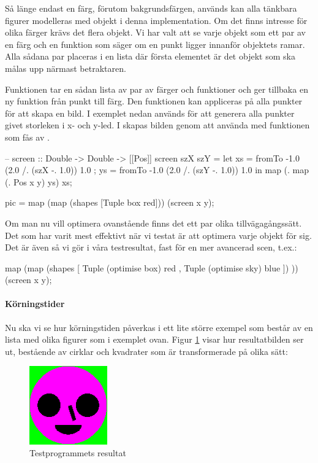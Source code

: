 \documentclass[Rapport]{subfiles}
\begin{document}
Så länge endast en färg, förutom bakgrundsfärgen, används kan alla tänkbara figurer modelleras
med objekt i denna implementation. Om det finns intresse för olika färger krävs det
flera objekt. Vi har valt att se varje objekt som ett par
av en färg och en funktion som säger om en punkt ligger innanför objektets ramar. 
Alla sådana par placeras i en lista där första elementet är det
objekt som ska målas upp närmast betraktaren. 

Funktionen  tar en sådan lista av par av färger och funktioner och 
ger tillbaka en ny funktion från punkt till färg. Den funktionen kan
appliceras på alla punkter för att skapa en bild. I exemplet nedan används 
för att generera alla punkter givet storleken i x- och y-led. I  skapas 
bilden genom att använda  med funktionen som fås av .

\begin{codeEx}

-- screen :: Double -> Double -> [[Pos]]
screen szX szY = let { xs = fromTo -1.0 (2.0 /. (szX -. 1.0)) 1.0
                     ; ys = fromTo -1.0 (2.0 /. (szY -. 1.0)) 1.0
                     }
                 in map (\x . map (\y . Pos x y) ys) xs;

pic = map (map (shapes [Tuple box red])) (screen x y);

\end{codeEx}

Om man nu vill optimera ovanstående finns det ett par olika tillvägagångssätt. 
Det som har varit mest effektivt när vi testat är att optimera varje objekt för sig. 
Det är även så vi gör i våra testresultat, fast för en mer avancerad scen, t.ex.: 
\begin{codeEx}
map (map (shapes 
             [ Tuple (optimise box) red
             , Tuple (optimise sky) blue 
             ])
         )) (screen x y);
\end{codeEx}


\paragraph{Körningstider}

Nu ska vi se hur körningstiden påverkas i ett lite större exempel som består av
en lista med olika figurer som i exemplet ovan. Figur \ref{fig:Resultat:shapes:bild} visar hur
resultatbilden ser ut, bestående av cirklar och kvadrater som är transformerade på olika sätt:

\begin{figure}[H]
\centering
    \includegraphics[width=0.3\textwidth]{img/shapes.png}
    \caption{Testprogrammets resultat}
    \label{fig:Resultat:shapes:bild}
\end{figure}
\end{document}
